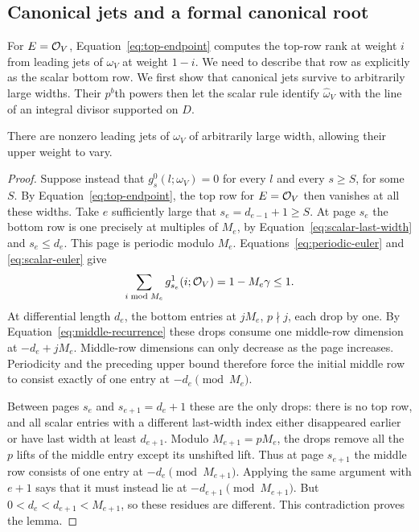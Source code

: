 \subsection{Canonical jets and a formal canonical root}

For $E=\mathcal O_V$, Equation~\ref{eq:top-endpoint} computes the top-row
rank at weight $i$ from leading jets of $\omega_V$ at weight $1-i$.
We need to describe that row as
explicitly as the scalar bottom row. We first show that canonical jets
survive to arbitrarily large widths. Their $p^b$th powers then let the
scalar rule identify $\widehat{\omega}_V$ with the line of an integral
divisor supported on $D$.

\begin{lemma}\label{lem:forced-canonical-jets}
There are nonzero leading jets of $\omega_V$ of arbitrarily
large width, allowing their upper weight to vary.
\end{lemma}

\begin{proof}
Suppose instead that $g_s^0(l;\omega_V)=0$ for every $l$
and every $s\geq S$, for some $S$. By
Equation~\ref{eq:top-endpoint}, the top row for $E=\mathcal O_V$
then vanishes at all these widths. Take $e$ sufficiently
large that $s_e=d_{e-1}+1\geq S$. At page $s_e$ the bottom
row is one precisely at multiples of $M_e$, by
Equation~\ref{eq:scalar-last-width} and
$s_e\leq d_e$. This page is periodic modulo $M_e$.
Equations~\ref{eq:periodic-euler} and
\ref{eq:scalar-euler} give
\[
 \sum_{i\bmod M_e}g_{s_e}^1(i;\mathcal O_V)
 =1-M_e\gamma\leq1.
\]
At differential length $d_e$, the bottom entries at $jM_e$,
$p\nmid j$, each drop by one. By
Equation~\ref{eq:middle-recurrence} these drops consume one
middle-row dimension at $-d_e+jM_e$. Middle-row dimensions
can only decrease as the page increases. Periodicity and
the preceding upper bound therefore force the initial middle
row to consist exactly of one entry at
$-d_e\pmod{M_e}$.

Between pages $s_e$ and $s_{e+1}=d_e+1$ these are the only
drops: there is no top row, and all scalar entries with a
different last-width index either disappeared earlier or have
last width at least $d_{e+1}$. Modulo $M_{e+1}=pM_e$, the
drops remove all the $p$ lifts of the middle entry except its
unshifted lift. Thus at page $s_{e+1}$ the middle row consists
of one entry at $-d_e\pmod{M_{e+1}}$. Applying the same
argument with $e+1$ says that it must instead lie at
$-d_{e+1}\pmod{M_{e+1}}$. But
$0<d_e<d_{e+1}<M_{e+1}$, so these residues are different.
This contradiction proves the lemma.
\end{proof}

